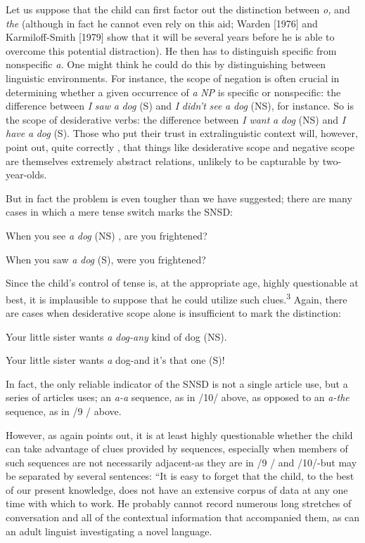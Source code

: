 Let us suppose that the child can first factor out the distinction between \textit{o,} and \textit{the} (although in fact he cannot even rely on this aid; Warden [1976] and Karmiloff-Smith [1979] show that it will be several years before he is able to overcome this potential distraction). He then has to distinguish specific from nonspecific \textit{a. }One might think he could do this by distinguishing between linguistic environ\-ments. For instance, the scope of negation is often crucial in determin\-ing whether a given occurrence of \textit{a} \textit{NP} is specific or nonspecific: the difference between \textit{I} \textit{saw} \textit{a} \textit{dog} (S) and \textit{I} \textit{didn't} \textit{see} \textit{a} \textit{dog} (NS), for instance. So is the scope of desiderative verbs: the difference between \textit{I} \textit{want} \textit{a} \textit{dog} (NS) and \textit{I} \textit{have} \textit{a} \textit{dog} (S). Those who put their trust in extralinguistic context will, however, point out, quite correctly , that things like desiderative scope and negative scope are themselves ex\-tremely abstract relations, unlikely to be capturable by two-year-olds.

But in fact the problem is even tougher than we have suggested; there are many cases in which a mere tense switch marks the SNSD:

\ea\label{ex:11}
 When you see \textit{a} \textit{dog} (NS) , are you frightened?
\glt
\z

\ea\label{ex:12}
 When you saw \textit{a} \textit{dog} (S), were you frightened?
\glt
\z

Since the child's control of tense is, at the appropriate age, highly questionable at best, it is implausible to suppose that he could utilize such clues.\textsuperscript{3} Again, there are cases when desiderative scope alone is insufficient to mark the distinction:

\ea\label{ex:13}
 Your little sister wants \textit{a} \textit{dog-any} kind of dog (NS).
\glt
\z

\ea\label{ex:14}
 Your little sister wants \textit{a} dog-and it's that one (S)!
\glt
\z

% 

In fact, the only reliable indicator of the SNSD is not a single article use, but a series of articles uses; an \textit{a-a }sequence, as in /10/ above, as opposed to an \textit{a-the} sequence, as in /9 / above.

However, as \citet[95]{Maratsos1976} again points out, it is at least highly questionable whether the child can take advantage of clues provided by sequences, especially when members of such sequences are not necessarily adjacent-as they are in /9 / and /10/-but may be separated by several sentences: ``It is easy to forget that the child, to the best of our present knowledge, does not have an extensive corpus of data at any one time with which to work. He probably cannot record numerous long stretches of conversation and all of the con\-textual information that accompanied them, as can an adult linguist investigating a novel language.{\textquotedbl}

